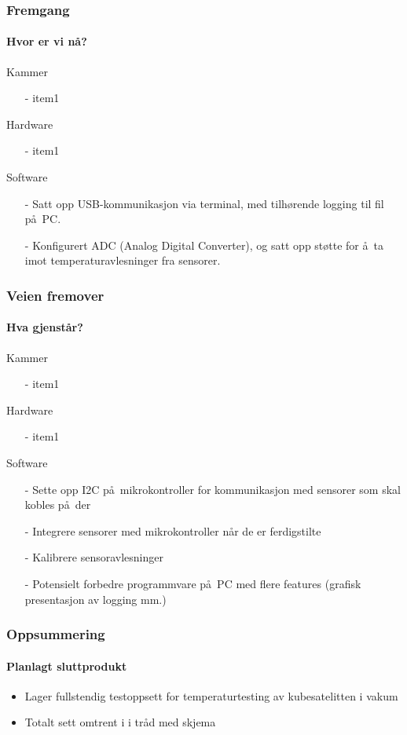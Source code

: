 \documentclass{beamer}
\begin{document}
  \begin{frame}
    \frametitle{Fremgang}
    \framesubtitle{Hvor er vi n\aa ?}
    \begin{block}{Kammer}
    	\begin{itemize}
    		\item[-] item1
    	\end{itemize}
    \end{block}
    \pause
    \begin{block}{Hardware}
    	\begin{itemize}
    		\item[-] item1
    	\end{itemize}
    \end{block}
    \pause
    \begin{block}{Software}
    	\begin{itemize}
    	\item[-] Satt opp USB-kommunikasjon via terminal, med tilh\o rende logging til fil p\aa\ PC.
    	\item[-] Konfigurert ADC (Analog Digital Converter), og satt opp st\o tte for \aa\ ta imot temperaturavlesninger fra sensorer.
    	\end{itemize}
    \end{block}
    
  \end{frame}
  \begin{frame}
    \frametitle{Veien fremover}
    \framesubtitle{Hva gjenst\aa r?}
        \begin{block}{Kammer}
    	\begin{itemize}
    		\item[-] item1
    	\end{itemize}
    \end{block}
    \pause
    \begin{block}{Hardware}
    	\begin{itemize}
    		\item[-] item1
    	\end{itemize}
    \end{block}
    \pause
    \begin{block}{Software}
    	\begin{itemize}
    	\item[-] Sette opp I2C p\aa\ mikrokontroller for kommunikasjon med sensorer som skal kobles p\aa\ der
    	\item[-] Integrere sensorer med mikrokontroller n\aa r de er ferdigstilte
    	\item[-] Kalibrere sensoravlesninger
    	\item[-] Potensielt forbedre programmvare p\aa\ PC med flere features (grafisk presentasjon av logging mm.)
    	\end{itemize}
    \end{block}
  \end{frame}
  \begin{frame}
    \frametitle{Oppsummering}
    \framesubtitle{Planlagt sluttprodukt}
    \begin{itemize}
    	\item Lager fullstendig testoppsett for temperaturtesting av kubesatelitten i vakum
    	\item Totalt sett omtrent i i tr\aa d med skjema
    \end{itemize}
  \end{frame}
\end{document}
